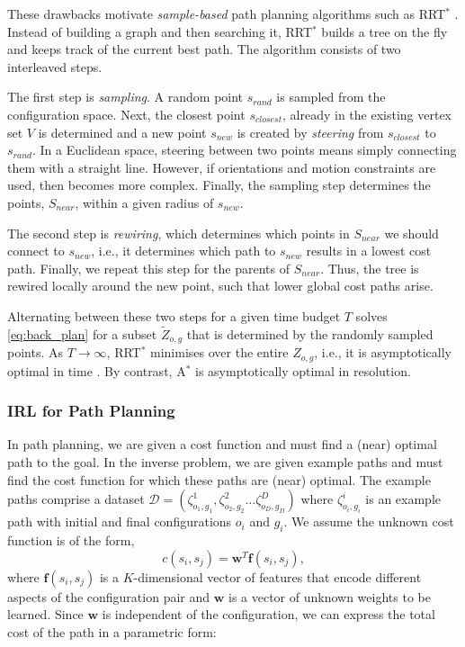 \documentclass[a4paper,11pt]{report}
\begin{document}
These drawbacks motivate \emph{sample-based} path planning algorithms such as RRT$^*$  \cite{karaman2011sampling}. Instead of building a graph and then searching it, RRT$^*$ builds a tree on the fly and keeps track of the current best path. The algorithm consists of two interleaved steps. 

The first step is \emph{sampling}. A random point $s_{rand}$ is sampled from the configuration space. Next, the closest point $s_{closest}$, already in the existing vertex set $V$ is determined and a new point $s_{new}$ is created by \emph{steering} from  $s_{closest}$ to $s_{rand}$. In a Euclidean space, steering between two points means simply connecting them with a straight line. However, if orientations and motion constraints are used, then becomes more complex. Finally, the sampling step determines the points, $S_{near}$, within a given radius of $s_{new}$.

The second step is \emph{rewiring}, which determines which points in $S_{near}$ we should connect to $s_{new}$, i.e., it determines which path to $s_{new}$ results in a lowest cost path. Finally, we repeat this step for the parents of $S_{near}$. Thus, the tree is rewired locally around the new point, such that lower global cost paths arise.

Alternating between these two steps for a given time budget $T$ solves \eqref{eq:back_plan} for a subset $\tilde{Z}_{o,g}$ that is determined by the randomly sampled points. As $T \rightarrow \infty$, RRT$^*$ minimises over the entire $Z_{o,g}$, i.e., it is asymptotically optimal in time \cite{karaman2011sampling}. By contrast, A$^*$ is asymptotically optimal in resolution.


\subsubsection{IRL for Path Planning \label{subsec:inverse_problem}}
In path planning, we are given a cost function and must find a (near) optimal path to the goal. In the inverse problem, we are given example paths and must find the cost function for which these paths are (near) optimal.  The example paths comprise a dataset $\mathcal{D} = (\zeta^1_{o_1,g_1},\zeta^2_{o_2,g_2}...\zeta^D_{o_D,g_D})$ where $\zeta^i_{o_i,g_i}$ is an example path with initial and final configurations $o_i$ and $g_i$. We assume the unknown cost function is of the form,
\begin{equation}
	c(s_i,s_j) = \mathbf{w}^T \mathbf{f}(s_i,s_j), \label{eq:inner_prod}
\end{equation}
where $\mathbf{f}(s_i,s_j)$ is a $K$-dimensional vector of features that encode different aspects of the configuration pair and $\mathbf{w}$ is a vector of unknown weights to be learned. Since $\mathbf{w}$ is independent of the configuration, we can express the total cost of the path in a parametric form:
\end{document}
